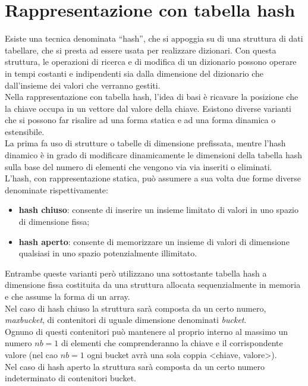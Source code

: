 \documentclass[12pt]{report}
\begin{document}
	\section{Rappresentazione con tabella hash}
	Esiste una tecnica denominata ``hash'', che si appoggia su di una struttura di dati tabellare, che si presta ad essere usata per realizzare dizionari. Con questa struttura, le operazioni di ricerca e di modifica di un dizionario possono operare in tempi costanti e indipendenti sia dalla dimensione del dizionario che dall'insieme dei valori che verranno gestiti. \\
	Nella rappresentazione con tabella hash, l'idea di basi è ricavare la posizione che la chiave occupa in un vettore dal valore della chiave. Esistono diverse varianti che si possono far risalire ad una forma statica e ad una forma dinamica o estensibile. \\
	La prima fa uso di strutture o tabelle di dimensione prefissata, mentre l'hash dinamico è in grado di modificare dinamicamente le dimensioni della tabella hash sulla base del numero di elementi che vengono via via inseriti o eliminati. \\
	L'hash, con rappresentazione statica, può assumere a sua volta due forme diverse denominate rispettivamente:
	\begin{itemize}
		\item \textbf{hash chiuso}: consente di inserire un insieme limitato di valori in uno spazio di dimensione fissa;
		\item \textbf{hash aperto}: consente di memorizzare un insieme di valori di dimensione qualsiasi in uno spazio potenzialmente illimitato.
	\end{itemize}
	Entrambe queste varianti però utilizzano una sottostante tabella hash a dimensione fissa costituita da una struttura allocata sequenzialmente in memoria e che assume la forma di un array. \\
	Nel caso di hash chiuso la struttura sarà composta da un certo numero, \textit{maxbucket}, di contenitori di uguale dimensione denominati \textit{bucket}. \\
	Ognuno di questi contenitori può mantenere al proprio interno al massimo un numero $nb=1$ di elementi che comprenderanno la chiave e il corrispondente valore (nel cao $nb=1$ ogni bucket avrà una sola coppia <chiave, valore>).\\
	Nel caso di hash aperto la struttura sarà composta da un certo numero indeterminato di contenitori bucket. \\
\end{document}
